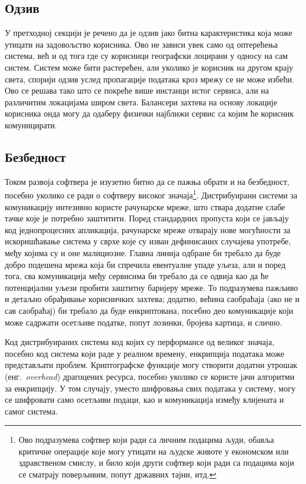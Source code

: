 \documentclass[12pt,oneside]{memoir}
\begin{document}
\subsection{Одзив}
У претходној секцији је речено да је одзив јако битна карактеристика која може утицати на задовољство корисника. Ово не зависи увек само од оптерећења система, већ и од тога где су корисници географски лоцирани у односу на сам систем. Систем може бити растерећен, али уколико је корисник на другом крају света, спорији одзив услед пропагације података кроз мрежу се не може избећи. Ово се решава тако што се покреће више инстанци истог сервиса, али на различитим локацијама широм света. Балансери захтева на основу локације корисника онда могу да одаберу физички најближи сервис са којим ће корисник комуницирати.

\subsection{Безбедност}
Током развоја софтвера је изузетно битно да се пажња обрати и на безбедност, посебно уколико се ради о софтверу високог значаја\footnote{Ово подразумева софтвер који ради са личним подацима људи, обавља критичне операције које могу утицати на људске животе у економском или здравственом смислу, и било који други софтвер који ради са подацима који се сматрају поверљивим, попут државних тајни, итд.}. Дистрибуирани системи за комуникацију интезивно користе рачунарске мреже, што ствара додатне слабе тачке које је потребно заштитити. Поред стандардних пропуста који се јављају код једнопроцесних апликација, рачунарске мреже отварају нове могућности за искоришћавање система у сврхе које су изван дефинисаних случајева употребе, међу којима су и оне малициозне. Главна линија одбране би требало да буде добро подешена мрежа која би спречила евентуалне упаде уљеза, али и поред тога, сва комуникација међу сервисима би требало да се одвија као да ће потенцијални уљези пробити заштитну баријеру мреже. То подразумева пажљиво и детаљно обрађивање корисничких захтева; додатно, већина саобраћаја (ако не и сав саобраћај) би требало да буде енкриптована, посебно део комуникације који може садржати осетљиве податке, попут лозинки, бројева картица, и слично.

Код дистрибуираних система код којих су перформансе од великог значаја, посебно код система који раде у реалном времену, енкрипција података може представљати проблем. Криптографске функције могу створити додатни утрошак (енг.~\textit{overhead}) драгоцених ресурса, посебно уколико се користе јачи алгоритми за енкрипцију. У том случају, уместо шифровања свих података у систему, могу се шифровати само осетљиви подаци, као и комуникација између клијената и самог система.
\end{document}
